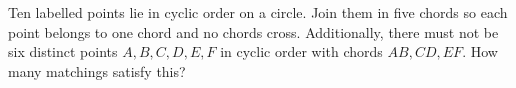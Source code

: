 Ten labelled points lie in cyclic order on a circle. Join them in five chords so each point belongs to one chord and no chords cross. Additionally, there must not be six distinct points $A,B,C,D,E,F$ in cyclic order with chords $AB,CD,EF$. How many matchings satisfy this?
